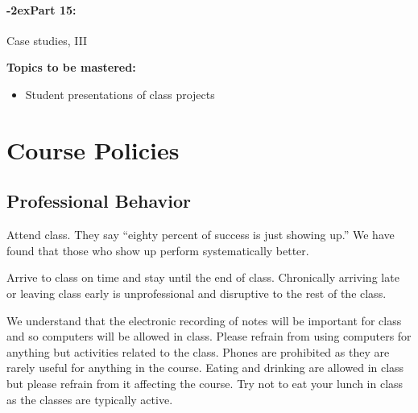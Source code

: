 \documentclass[11pt]{article}
\newcommand{\week}[1]{%
    \paragraph*{\kern-2ex\quad #1, \syldate{\today} - \AdvanceDate[4]\syldate{\today}:}%
    \ifdim\wd1=\wd\MONDAY
      \AdvanceDate[7]
    \else
      \AdvanceDate[7]
    \fi%
  }
\newcommand{\module}[1]{%
    \paragraph*{\kern-2ex\quad #1:}
  }
\begin{document}
  \module{Part  15} Case studies, III

  \bigskip

  {\bf Topics to be mastered:}
  \begin{itemize}
    \item Student presentations of class projects
  \end{itemize}






\newpage
\section*{Course Policies}

\subsection*{Professional Behavior}

\footnotesize{
  Attend class. They say ``eighty percent of success is just showing up.'' We have found that
  those who show up perform systematically better.
}

\footnotesize{
  Arrive to class on time and stay until the end of class. Chronically arriving late or leaving
  class early is unprofessional and disruptive to the rest of the class.
}

\footnotesize{
  We understand that the electronic recording of notes will be important for class and
  so computers will be allowed in class. Please refrain from using computers for anything but
  activities related to the class. Phones are prohibited as they are rarely useful for anything in
  the course. Eating and drinking are allowed in class but please refrain from it affecting the
  course. Try not to eat your lunch in class as the classes are typically active.
}
\end{document}
